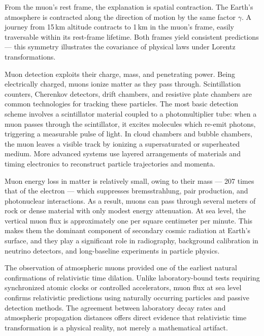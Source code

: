 From the muon’s rest frame, the explanation is spatial contraction. The Earth’s atmosphere is contracted along the direction of motion by the same factor $\gamma$. A journey from 15 km altitude contracts to 1 km in the muon’s frame, easily traversable within its rest-frame lifetime. Both frames yield consistent predictions — this symmetry illustrates the covariance of physical laws under Lorentz transformations.

Muon detection exploits their charge, mass, and penetrating power. Being electrically charged, muons ionize matter as they pass through. Scintillation counters, Cherenkov detectors, drift chambers, and resistive plate chambers are common technologies for tracking these particles. The most basic detection scheme involves a scintillator material coupled to a photomultiplier tube: when a muon passes through the scintillator, it excites molecules which re-emit photons, triggering a measurable pulse of light. In cloud chambers and bubble chambers, the muon leaves a visible track by ionizing a supersaturated or superheated medium. More advanced systems use layered arrangements of materials and timing electronics to reconstruct particle trajectories and momenta.

Muon energy loss in matter is relatively small, owing to their mass — 207 times that of the electron — which suppresses bremsstrahlung, pair production, and photonuclear interactions. As a result, muons can pass through several meters of rock or dense material with only modest energy attenuation. At sea level, the vertical muon flux is approximately one per square centimeter per minute. This makes them the dominant component of secondary cosmic radiation at Earth’s surface, and they play a significant role in radiography, background calibration in neutrino detectors, and long-baseline experiments in particle physics.

The observation of atmospheric muons provided one of the earliest natural confirmations of relativistic time dilation. Unlike laboratory-bound tests requiring synchronized atomic clocks or controlled accelerators, muon flux at sea level confirms relativistic predictions using naturally occurring particles and passive detection methods. The agreement between laboratory decay rates and atmospheric propagation distances offers direct evidence that relativistic time transformation is a physical reality, not merely a mathematical artifact.

